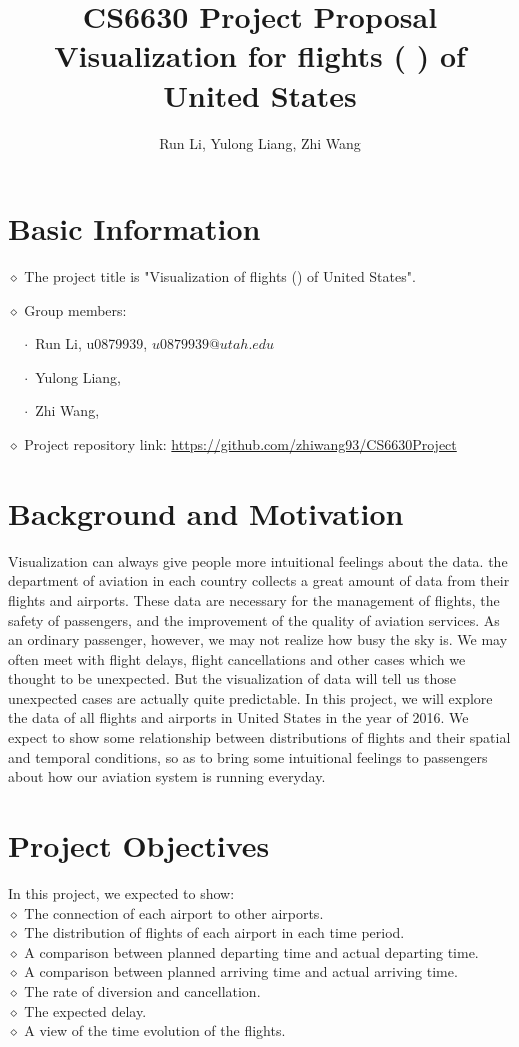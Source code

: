 \documentclass[12pt]{article}
\title{CS6630 Project Proposal\\
       Visualization for flights ( ) of United States}
\author{Run Li, Yulong Liang, Zhi Wang}
\begin{document}
\maketitle

\section{Basic Information}
    $\diamond$ The project title is "Visualization of flights () of United States".

    $\diamond$ Group members:

    $\quad\cdot$ Run Li, u0879939, $u0879939@utah.edu$

    $\quad\cdot$ Yulong Liang,

    $\quad\cdot$ Zhi Wang,

    $\diamond$ Project repository link: \url{https://github.com/zhiwang93/CS6630Project}

\section{Background and Motivation}
    Visualization can always give people more intuitional feelings about the data. the department of aviation in each country collects a great amount of data from their flights and airports. These data are necessary for the management of flights, the safety of passengers, and the improvement of the quality of aviation services. As an ordinary passenger, however, we may not realize how busy the sky is. We may often meet with flight delays, flight cancellations and other cases which we thought to be unexpected. But the visualization of data will tell us those unexpected cases are actually quite predictable. In this project, we will explore the data of all flights and airports in United States in the year of 2016. We expect to show some relationship between distributions of flights and their spatial and temporal conditions, so as to bring some intuitional feelings to passengers about how our aviation system is running everyday.
\section{Project Objectives}
    \noindent In this project, we expected to show:\\   
    $\diamond$ The connection of each airport to other airports.\\
    $\diamond$ The distribution of flights of each airport in each time period.\\
    $\diamond$ A comparison between planned departing time and actual departing time.\\
    $\diamond$ A comparison between planned arriving time and actual arriving time.\\
    $\diamond$ The rate of diversion and cancellation.\\
    $\diamond$ The expected delay.\\
    $\diamond$ A view of the time evolution of the flights.
    
\end{document}
